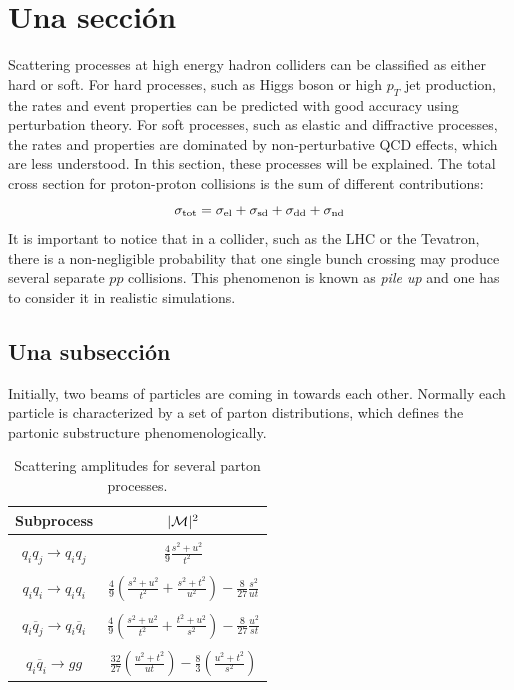 \documentclass[11pt,a4paper,twoside,pdf]{article}
\numberwithin{equation}{section}
\newcommand{\dis}{\displaystyle}
\begin{document}
\section{Una sección}

Scattering processes at high energy hadron colliders can be classified as either hard or soft. For hard processes, such as Higgs boson or high $p_{T}$ jet production, the rates and event properties can be predicted with good accuracy using perturbation theory.
For soft processes, such as elastic and diffractive processes, the rates and properties are dominated by non-perturbative QCD effects, which are less understood. In this section, these processes will be explained. The total cross section for proton-proton collisions is the sum of different contributions:
\begin{equation}
\sigma_{\rm tot}=\sigma_{\rm el}+\sigma_{\rm sd}+\sigma_{\rm dd}+\sigma_{\rm nd}
\end{equation}
It is important to notice that in a collider, such as the LHC or the Tevatron, there is a non-negligible probability that one single bunch crossing may produce several separate $pp$ collisions. This phenomenon is known as {\em pile up} and one has to consider it in realistic simulations.

\subsection{Una subsección}

Initially, two beams of particles are coming in towards each other. Normally each particle is characterized by a set of parton distributions, which defines the partonic substructure phenomenologically.

\begin{table}
\centering
\begin{tabular} {c|c}
Subprocess & $|{\cal{M}}|^2$ \\ \hline 
\\
$q_{i}q_{j}\rightarrow q_{i}q_{j}$ & $\dis\frac{4}{9}\dis\frac{s^2+u^2}{t^2}$ \\ \\
$q_{i}q_{i}\rightarrow q_{i}q_{i}$ & $\dis\frac{4}{9}\left(\dis\frac{s^2+u^2}{t^2}+\dis\frac{s^2+t^2}{u^2}\right)-\dis\frac{8}{27}\dis\frac{s^2}{ut}$ \\ \\
$q_{i}\overline{q}_j\rightarrow q_{i}\overline{q}_i$ &$\dis\frac{4}{9}\left(\dis\frac{s^2+u^2}{t^2}+\dis\frac{t^2+u^2}{s^2}\right)-\dis\frac{8}{27}\dis\frac{u^2}{st}$ \\ \\
$q_{i}\overline{q}_{i}\rightarrow gg$ & $\dis\frac{32}{27}\left(\dis\frac{u^2+t^2}{ut}\right)-\dis\frac{8}{3}\left(\dis\frac{u^2+t^2}{s^2}\right)$ 
\end{tabular}
\caption{Scattering amplitudes for several parton processes. \label{tabla1}}
\end{table}
\end{document}
